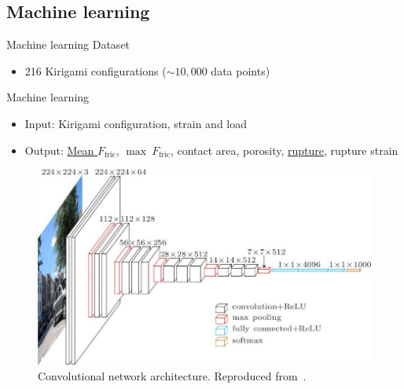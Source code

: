 \documentclass[
	10pt, %
]{beamer}
\begin{document}
\subsection{Machine learning}
\begin{frame}{Machine learning}
	Dataset
	\begin{itemize}
		\item 216 Kirigami configurations ($\sim 10,000$ data points)
	\end{itemize}
	\vspace*{5mm}
	Machine learning
	\begin{itemize}
		\item Input: Kirigami configuration, strain and load
		\item Output: \underline{Mean $F_{\text{fric}}$}, $\max \ F_{\text{fric}}$, contact area, porosity, \underline{rupture}, rupture strain
	\end{itemize}

	\begin{figure}[H]
		\centering
		\includegraphics[width=0.5\linewidth]{../thesis/figures/ML/VGGNet16.jpg}
		\caption{Convolutional network architecture. Reproduced from~\cite{VGGNet_16_image}.}
	\end{figure}
\end{frame}
%
%
%
%

\end{document}
